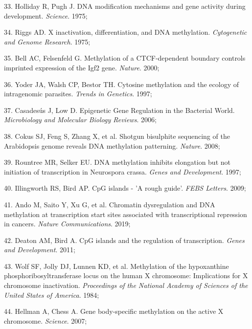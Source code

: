 \documentclass[11pt,oneside]{bristolthesis}
\newenvironment{cslreferences}%
  {}%
  {\par}
\begin{document}
\begin{cslreferences}
\leavevmode\hypertarget{ref-Holliday1975}{}%
33. Holliday R, Pugh J. DNA modification mechanisms and gene activity during development. \emph{Science}. 1975;

\leavevmode\hypertarget{ref-Riggs1975}{}%
34. Riggs AD. X inactivation, differentiation, and DNA methylation. \emph{Cytogenetic and Genome Research}. 1975;

\leavevmode\hypertarget{ref-Bell2000}{}%
35. Bell AC, Felsenfeld G. Methylation of a CTCF-dependent boundary controls imprinted expression of the Igf2 gene. \emph{Nature}. 2000;

\leavevmode\hypertarget{ref-Yoder1997}{}%
36. Yoder JA, Walsh CP, Bestor TH. Cytosine methylation and the ecology of intragenomic parasites. \emph{Trends in Genetics}. 1997;

\leavevmode\hypertarget{ref-Casadesus2006}{}%
37. Casadesús J, Low D. Epigenetic Gene Regulation in the Bacterial World. \emph{Microbiology and Molecular Biology Reviews}. 2006;

\leavevmode\hypertarget{ref-Cokus2008}{}%
38. Cokus SJ, Feng S, Zhang X, et al. Shotgun bisulphite sequencing of the Arabidopsis genome reveals DNA methylation patterning. \emph{Nature}. 2008;

\leavevmode\hypertarget{ref-Rountree1997}{}%
39. Rountree MR, Selker EU. DNA methylation inhibits elongation but not initiation of transcription in Neurospora crassa. \emph{Genes and Development}. 1997;

\leavevmode\hypertarget{ref-Illingworth2009}{}%
40. Illingworth RS, Bird AP. CpG islands - 'A rough guide'. \emph{FEBS Letters}. 2009;

\leavevmode\hypertarget{ref-Ando2019}{}%
41. Ando M, Saito Y, Xu G, et al. Chromatin dysregulation and DNA methylation at transcription start sites associated with transcriptional repression in cancers. \emph{Nature Communications}. 2019;

\leavevmode\hypertarget{ref-Deaton2011}{}%
42. Deaton AM, Bird A. CpG islands and the regulation of transcription. \emph{Genes and Development}. 2011;

\leavevmode\hypertarget{ref-Wolf1984}{}%
43. Wolf SF, Jolly DJ, Lunnen KD, et al. Methylation of the hypoxanthine phosphoribosyltransferase locus on the human X chromosome: Implications for X chromosome inactivation. \emph{Proceedings of the National Academy of Sciences of the United States of America}. 1984;

\leavevmode\hypertarget{ref-Hellman2007}{}%
44. Hellman A, Chess A. Gene body-specific methylation on the active X chromosome. \emph{Science}. 2007;


\end{cslreferences}
\end{document}
